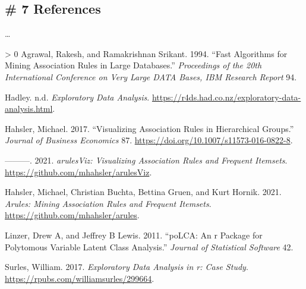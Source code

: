 \documentclass{acm_proc_article-sp}
\newlength{\cslhangindent}
\newenvironment{CSLReferences}[3] %
 {%
  \setlength{\parindent}{0pt}
  \ifodd #1 \everypar{\setlength{\hangindent}{\cslhangindent}}\ignorespaces\fi
  \ifnum #2 > 0
  \setlength{\parskip}{#2\baselineskip}
  \fi
 }%
 {}
\begin{document}
\hypertarget{references}{%
\subsection{\# 7 References}\label{references}}

\ldots{}

\hypertarget{refs}{}
\begin{CSLReferences}{1}{0}
\leavevmode\hypertarget{ref-agrawal1994}{}%
Agrawal, Rakesh, and Ramakrishnan Srikant. 1994. {``Fast Algorithms for
Mining Association Rules in Large Databases.''} \emph{Proceedings of the
20th International Conference on Very Large DATA Bases, IBM Research
Report} 94.

\leavevmode\hypertarget{ref-HADLEY}{}%
Hadley. n.d. \emph{Exploratory Data Analysis}.
\url{https://r4ds.had.co.nz/exploratory-data-analysis.html}.

\leavevmode\hypertarget{ref-michael2017}{}%
Hahsler, Michael. 2017. {``Visualizing Association Rules in Hierarchical
Groups.''} \emph{Journal of Business Economics} 87.
\url{https://doi.org/10.1007/s11573-016-0822-8}.

\leavevmode\hypertarget{ref-R-arulesViz}{}%
---------. 2021. \emph{arulesViz: Visualizing Association Rules and
Frequent Itemsets}. \url{https://github.com/mhahsler/arulesViz}.

\leavevmode\hypertarget{ref-R-arules}{}%
Hahsler, Michael, Christian Buchta, Bettina Gruen, and Kurt Hornik.
2021. \emph{Arules: Mining Association Rules and Frequent Itemsets}.
\url{https://github.com/mhahsler/arules}.

\leavevmode\hypertarget{ref-KBH2006}{}%
Linzer, Drew A, and Jeffrey B Lewis. 2011. {``poLCA: An r Package for
Polytomous Variable Latent Class Analysis.''} \emph{Journal of
Statistical Software} 42.

\leavevmode\hypertarget{ref-William2017}{}%
Surles, William. 2017. \emph{Exploratory Data Analysis in r: Case
Study}. \url{https://rpubs.com/williamsurles/299664}.

\end{CSLReferences}
\setlength{\parindent}{0in}
\end{document}
